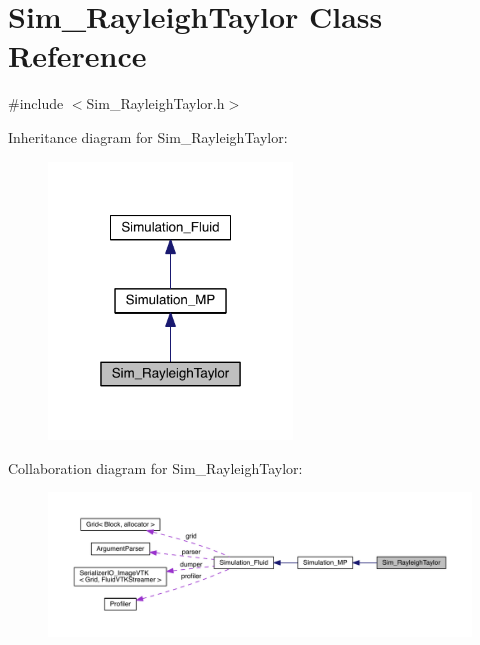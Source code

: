 \hypertarget{class_sim___rayleigh_taylor}{}\section{Sim\+\_\+\+Rayleigh\+Taylor Class Reference}
\label{class_sim___rayleigh_taylor}


{\ttfamily \#include $<$Sim\+\_\+\+Rayleigh\+Taylor.\+h$>$}



Inheritance diagram for Sim\+\_\+\+Rayleigh\+Taylor\+:\nopagebreak
\begin{figure}[H]
\begin{center}
\leavevmode
\includegraphics[width=184pt]{d5/dc7/class_sim___rayleigh_taylor__inherit__graph}
\end{center}
\end{figure}


Collaboration diagram for Sim\+\_\+\+Rayleigh\+Taylor\+:\nopagebreak
\begin{figure}[H]
\begin{center}
\leavevmode
\includegraphics[width=350pt]{d4/d46/class_sim___rayleigh_taylor__coll__graph}
\end{center}
\end{figure}

